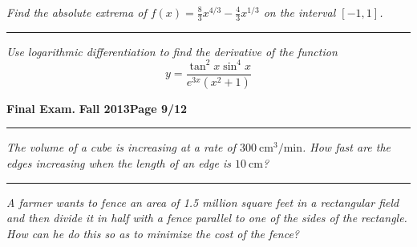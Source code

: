 \documentclass[12pt]{article}
\begin{document}
\bigskip
{\problem[10 pts] \em Find the absolute extrema of $f(x) = \frac{8}{3} x^{4/3} - \frac{4}{3} x^{1/3}$ on the interval $[-1,1]$.}
\vspace{6cm}
\begin{flushright}
\end{flushright}
\hrule
{\problem[10 pts] \em Use logarithmic differentiation to find the
  derivative of the function 
\begin{equation*}
y=\frac{\tan^2 x \sin^4 x}{e^{3x}(x^2+1)}
\end{equation*}
\vspace{7cm}
\begin{flushright}
\end{flushright}
\newpage

\hfill{\large\bf Final Exam.}\hfill{\large\bf
  Fall 2013}\hfill{\large\bf Page 9/12}\hrule

\bigskip
{\problem[10 pts] \em The volume of a cube is increasing at a rate of
  $300~\text{cm}^3/\text{min}$.  How fast are the edges increasing
  when the length of an edge is $10~\text{cm}$?}
\vspace{6cm}
\begin{flushright}
\end{flushright}
\hrule
{\problem[15 pts] \em A farmer wants to fence an area of 1.5 million square feet in a rectangular field and then divide it in half with a fence parallel to one of the sides of the rectangle.  How can he do this so as to minimize the cost of the fence?}
\vspace{11cm}
\begin{flushright}
\end{flushright}

}
\end{document}
